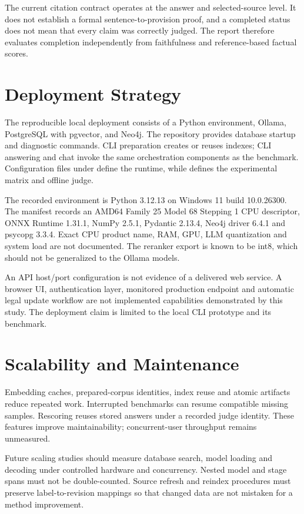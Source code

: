 \documentclass[11pt,a4paper,oneside]{report}
\begin{document}
The current citation contract operates at the answer and selected-source level. It does not establish a formal sentence-to-provision proof, and a completed status does not mean that every claim was correctly judged. The report therefore evaluates completion independently from faithfulness and reference-based factual scores.

\section{Deployment Strategy}
The reproducible local deployment consists of a Python environment, Ollama, PostgreSQL with pgvector, and Neo4j. The repository provides database startup and diagnostic commands. CLI preparation creates or reuses indexes; CLI answering and chat invoke the same orchestration components as the benchmark. Configuration files under  define the runtime, while  defines the experimental matrix and offline judge.

The recorded environment is Python 3.12.13 on Windows 11 build 10.0.26300. The manifest records an AMD64 Family 25 Model 68 Stepping 1 CPU descriptor, ONNX Runtime 1.31.1, NumPy 2.5.1, Pydantic 2.13.4, Neo4j driver 6.4.1 and psycopg 3.3.4. Exact CPU product name, RAM, GPU, LLM quantization and system load are not documented. The reranker export is known to be int8, which should not be generalized to the Ollama models.

An API host/port configuration is not evidence of a delivered web service. A browser UI, authentication layer, monitored production endpoint and automatic legal update workflow are not implemented capabilities demonstrated by this study. The deployment claim is limited to the local CLI prototype and its benchmark.

\section{Scalability and Maintenance}
Embedding caches, prepared-corpus identities, index reuse and atomic artifacts reduce repeated work. Interrupted benchmarks can resume compatible missing samples. Rescoring reuses stored answers under a recorded judge identity. These features improve maintainability; concurrent-user throughput remains unmeasured.

Future scaling studies should measure database search, model loading and decoding under controlled hardware and concurrency. Nested model and stage spans must not be double-counted. Source refresh and reindex procedures must preserve label-to-revision mappings so that changed data are not mistaken for a method improvement.
\end{document}
